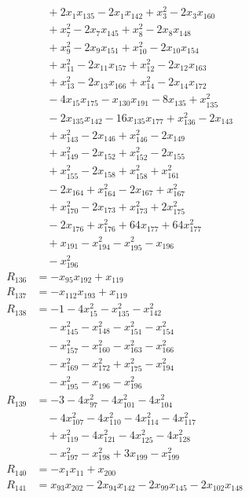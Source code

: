 \begin{align*}
&\quad{}+2x_{1}x_{135}-2x_{1}x_{142}+x_{3}^{2}-2x_{3}x_{160}\\
&\quad{}+x_{7}^{2}-2x_{7}x_{145}+x_{8}^{2}-2x_{8}x_{148}\\
&\quad{}+x_{9}^{2}-2x_{9}x_{151}+x_{10}^{2}-2x_{10}x_{154}\\
&\quad{}+x_{11}^{2}-2x_{11}x_{157}+x_{12}^{2}-2x_{12}x_{163}\\
&\quad{}+x_{13}^{2}-2x_{13}x_{166}+x_{14}^{2}-2x_{14}x_{172}\\
&\quad{}-4x_{15}x_{175}-x_{130}x_{191}-8x_{135}+x_{135}^{2}\\
&\quad{}-2x_{135}x_{142}-16x_{135}x_{177}+x_{136}^{2}-2x_{143}\\
&\quad{}+x_{143}^{2}-2x_{146}+x_{146}^{2}-2x_{149}\\
&\quad{}+x_{149}^{2}-2x_{152}+x_{152}^{2}-2x_{155}\\
&\quad{}+x_{155}^{2}-2x_{158}+x_{158}^{2}+x_{161}^{2}\\
&\quad{}-2x_{164}+x_{164}^{2}-2x_{167}+x_{167}^{2}\\
&\quad{}+x_{170}^{2}-2x_{173}+x_{173}^{2}+2x_{175}^{2}\\
&\quad{}-2x_{176}+x_{176}^{2}+64x_{177}+64x_{177}^{2}\\
&\quad{}+x_{191}-x_{194}^{2}-x_{195}^{2}-x_{196}\\
&\quad{}-x_{196}^{2}\\
R_{136}&=-x_{95}x_{192}+x_{119}\\
R_{137}&=-x_{112}x_{193}+x_{119}\\
R_{138}&=-1-4x_{15}^{2}-x_{135}^{2}-x_{142}^{2}\\
&\quad{}-x_{145}^{2}-x_{148}^{2}-x_{151}^{2}-x_{154}^{2}\\
&\quad{}-x_{157}^{2}-x_{160}^{2}-x_{163}^{2}-x_{166}^{2}\\
&\quad{}-x_{169}^{2}-x_{172}^{2}+x_{175}^{2}-x_{194}^{2}\\
&\quad{}-x_{195}^{2}-x_{196}-x_{196}^{2}\\
R_{139}&=-3-4x_{97}^{2}-4x_{101}^{2}-4x_{104}^{2}\\
&\quad{}-4x_{107}^{2}-4x_{110}^{2}-4x_{114}^{2}-4x_{117}^{2}\\
&\quad{}+x_{119}^{2}-4x_{121}^{2}-4x_{125}^{2}-4x_{128}^{2}\\
&\quad{}-x_{197}^{2}-x_{198}^{2}+3x_{199}-x_{199}^{2}\\
R_{140}&=-x_{1}x_{11}+x_{200}\\
R_{141}&=x_{93}x_{202}-2x_{94}x_{142}-2x_{99}x_{145}-2x_{102}x_{148}\\

\end{align*}
